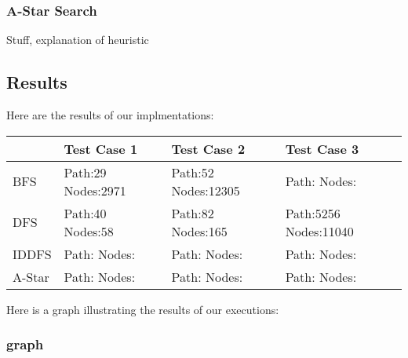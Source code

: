 \documentclass[10pt,letterpaper]{article}
\begin{document}
	\subsubsection{A-Star Search}
Stuff, explanation of heuristic

  \subsection{Results}
  Here are the results of our implmentations:


  \begin{center}
      \begin{tabular}{ | l | p{2cm} | p{2cm} | p{2cm} |}
      \hline
      & Test Case 1 & Test Case 2 & Test Case 3 \\ \hline
      BFS & Path:29  Nodes:2971 & Path:52  Nodes:12305  & Path:  Nodes: \\ \hline
      DFS & Path:40  Nodes:58 & Path:82  Nodes:165 & Path:5256  Nodes:11040 \\ \hline
      IDDFS & Path:  Nodes: & Path:  Nodes: & Path:  Nodes: \\ \hline
      A-Star & Path:  Nodes: & Path:  Nodes: & Path:  Nodes: \\ \hline
      \end{tabular}
  \end{center}


	Here is a graph illustrating the results of our executions:
  \subsubsection{graph}
    \begin{center}
  \end{center}
\end{document}

